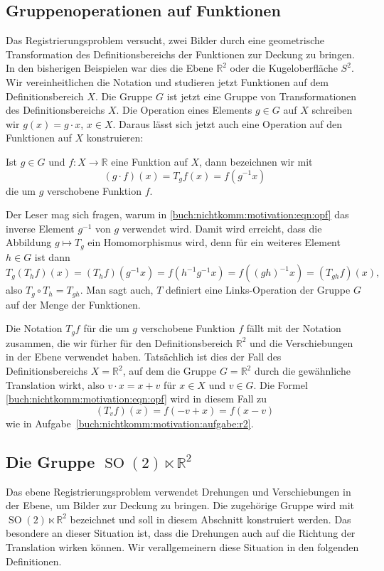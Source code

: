 \subsection{Gruppenoperationen auf Funktionen
\label{buch:nichtkomm:motivation:subsection:gruppenoperationen}}
Das Registrierungsproblem versucht, zwei Bilder durch eine geometrische
Transformation des Definitionsbereichs der Funktionen zur Deckung
zu bringen.
In den bisherigen Beispielen war dies die Ebene $\mathbb{R}^2$ oder
die Kugeloberfläche $S^2$.
Wir vereinheitlichen die Notation und studieren jetzt Funktionen
auf dem Definitionsbereich $X$.
Die Gruppe $G$ ist jetzt eine Gruppe von Transformationen des
Definitionsbereichs $X$.
Die Operation eines Elements $g\in G$ auf $X$ schreiben wir
$g(x) = g\cdot x$, $x\in X$.
Daraus lässt sich jetzt auch eine Operation auf den Funktionen auf
$X$ konstruieren:

\begin{definition}
Ist $g\in G$ und $f\colon X\to\mathbb{R}$ eine Funktion auf $X$, dann
bezeichnen wir mit
\begin{equation}
(g\cdot f)(x)
=
T_gf(x)
=
f(g^{-1}x)
\label{buch:nichtkomm:motivation:eqn:opf}
\end{equation}
die um $g$ verschobene Funktion $f$.
\end{definition}

Der Leser mag sich fragen, warum in
\eqref{buch:nichtkomm:motivation:eqn:opf}
das inverse Element $g^{-1}$ von $g$ verwendet wird.
Damit wird erreicht, dass die Abbildung $g\mapsto T_g$
ein Homomorphismus wird, denn für ein weiteres Element $h\in G$
ist dann
\[
T_g(T_hf)(x)
=
(T_hf)(g^{-1}x)
=
f(h^{-1}g^{-1}x)
=
f((gh)^{-1}x)
=
(T_{gh}f)(x),
\]
also $T_g\circ T_h= T_{gh}$.
Man sagt auch, $T$ definiert eine Links-Operation der Gruppe $G$ 
auf der Menge der Funktionen.

Die Notation $T_gf$ für die um $g$ verschobene Funktion $f$ fällt
mit der Notation zusammen, die wir fürher für den Definitionsbereich
$\mathbb{R}^2$ und die Verschiebungen in der Ebene verwendet haben.
Tatsächlich ist dies der Fall des Definitionsbereichs $X=\mathbb{R}^2$,
auf dem die Gruppe $G=\mathbb{R}^2$ durch die gewähnliche
Translation wirkt, also $v\cdot x = x +v$ für $x\in X$ und $v\in G$.
Die Formel \eqref{buch:nichtkomm:motivation:eqn:opf} wird in diesem
Fall zu
\[
(T_vf)(x) = f(-v + x) = f(x-v)
\]
wie in Aufgabe~\ref{buch:nichtkomm:motivation:aufgabe:r2}.

%
%
\subsection{Die Gruppe $\operatorname{SO}(2)\ltimes \mathbb{R}^2$
\label{buch:nichtkomm:motivation:subsection:so2lr2}}
Das ebene Registrierungsproblem verwendet Drehungen und Verschiebungen
in der Ebene, um Bilder zur Deckung zu bringen.
Die zugehörige Gruppe wird mit $\operatorname{SO}(2)\ltimes\mathbb{R}^2$
bezeichnet und soll in diesem Abschnitt konstruiert werden.
Das besondere an dieser Situation ist, dass die Drehungen auch auf
die Richtung der Translation wirken können.
Wir verallgemeinern diese Situation in den folgenden Definitionen.

